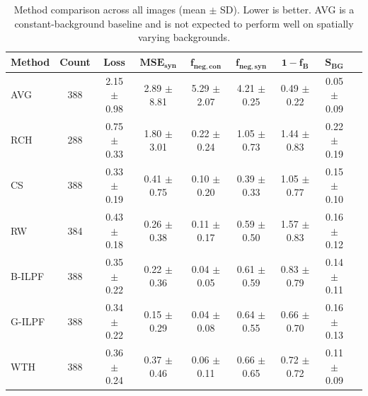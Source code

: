\documentclass[iucr]{iucrjournals}
\begin{document}
\begin{table}[t]
\caption{Method comparison across all images (mean $\pm$ SD). Lower is better. AVG is a constant-background baseline and is not expected to perform well on spatially varying backgrounds.}

\label{tab:method_performance_new}
\centering
\small
\setlength{\tabcolsep}{3pt}
\renewcommand{\arraystretch}{1.1}
\begin{tabular}{@{}lcccccccc@{}}
\toprule
\textbf{Method} & \textbf{Count} & \textbf{Loss} &
$\mathbf{MSE}_{\mathbf{syn}}$ &
$\mathbf{f}_{\mathbf{neg,con}}$ &
$\mathbf{f}_{\mathbf{neg,syn}}$ &
$\mathbf{1-f_B}$ &
$\mathbf{S}_{\mathbf{BG}}$ \\ \midrule
AVG & 388 & 2.15 $\pm$ 0.98 &  2.89 $\pm$ 8.81 & 5.29 $\pm$ 2.07 & 4.21 $\pm$ 0.25 & 0.49 $\pm$ 0.22 &  0.05 $\pm$  0.09 \\
RCH & 288 & 0.75 $\pm$  0.33 & 1.80 $\pm$  3.01 & 0.22 $\pm$  0.24 & 1.05 $\pm$  0.73 & 1.44 $\pm$  0.83 & 0.22 $\pm$  0.19 \\
CS & 388 & 0.33 $\pm$ 0.19 & 0.41 $\pm$ 0.75 & 0.10 $\pm$ 0.20 & 0.39 $\pm$ 0.33 & 1.05 $\pm$ 0.77 & 0.15 $\pm$ 0.10 \\
RW & 384 & 0.43 $\pm$  0.18 & 0.26 $\pm$  0.38 & 0.11 $\pm$  0.17 & 0.59 $\pm$  0.50 & 1.57 $\pm$  0.83 & 0.16 $\pm$  0.12 \\
B-ILPF & 388 & 0.35 $\pm$ 0.22 & 0.22 $\pm$ 0.36 & 0.04 $\pm$ 0.05 & 0.61 $\pm$ 0.59 & 0.83 $\pm$ 0.79 & 0.14 $\pm$ 0.11 \\
G-ILPF & 388 & 0.34 $\pm$ 0.22 & 0.15 $\pm$ 0.29 & 0.04 $\pm$ 0.08 & 0.64 $\pm$ 0.55 & 0.66 $\pm$ 0.70 & 0.16 $\pm$ 0.13 \\
WTH & 388 & 0.36 $\pm$ 0.24 & 0.37 $\pm$ 0.46 & 0.06 $\pm$ 0.11 & 0.66 $\pm$ 0.65 & 0.72 $\pm$ 0.72 & 0.11 $\pm$ 0.09 \\
\bottomrule
\end{tabular}
\end{table}
\end{document}
